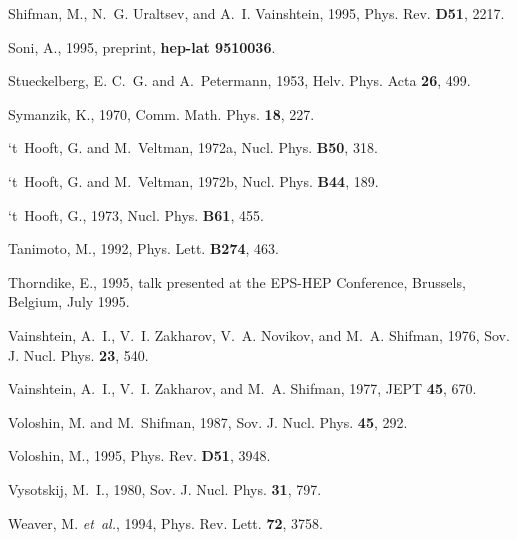 \begin{thebibliography}{\protect{}1991}
Shifman, M., N.~G. Uraltsev, and A.~I. Vainshtein, 1995,
\newblock Phys. Rev. {\bf D51}, 2217.

Soni, A., 1995,
\newblock preprint, {\bf hep-lat 9510036}.

Stueckelberg, E. C.~G. and A.~Petermann, 1953,
\newblock Helv. Phys. Acta {\bf 26}, 499.

Symanzik, K., 1970,
\newblock Comm. Math. Phys. {\bf 18}, 227.

`t~Hooft, G. and M.~Veltman, 1972a,
\newblock Nucl. Phys. {\bf B50}, 318.

`t~Hooft, G. and M.~Veltman, 1972b,
\newblock Nucl. Phys. {\bf B44}, 189.

`t~Hooft, G., 1973,
\newblock Nucl. Phys. {\bf B61}, 455.

Tanimoto, M., 1992,
\newblock Phys. Lett. {\bf B274}, 463.

Thorndike, E., 1995,
\newblock talk presented at the EPS-HEP Conference, Brussels, Belgium, July
  1995.

Vainshtein, A.~I., V.~I. Zakharov, V.~A. Novikov, and M.~A. Shifman, 1976,
\newblock Sov. J. Nucl. Phys. {\bf 23}, 540.

Vainshtein, A.~I., V.~I. Zakharov, and M.~A. Shifman, 1977,
\newblock JEPT {\bf 45}, 670.

Voloshin, M. and M.~Shifman, 1987,
\newblock Sov. J. Nucl. Phys. {\bf 45}, 292.

Voloshin, M., 1995,
\newblock Phys. Rev. {\bf D51}, 3948.

Vysotskij, M.~I., 1980,
\newblock Sov. J. Nucl. Phys. {\bf 31}, 797.

Weaver, M. {\em et~al.\/}, 1994,
\newblock Phys. Rev. Lett. {\bf 72}, 3758.


\end{thebibliography}
